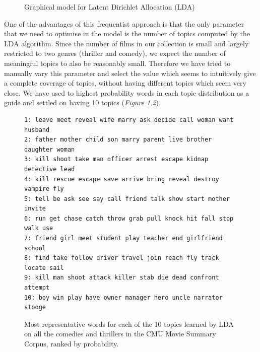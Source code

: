 \documentclass[bsc,frontabs,singlespacing,parskip, twoside]{infthesis}
\begin{document}
\begin{figure}[h!]
\centering
{}
\caption{Graphical model for Latent Dirichlet Allocation (LDA)}
\label{fig:lda}
\end{figure}

One of the advantages of this frequentist approach is that the only parameter that we need to optimise in the model is the number of topics computed by the LDA algorithm. Since the number of films in our collection is small and largely restricted to two genres (thriller and comedy), we expect the number of meaningful topics to also be reasonably small. Therefore we have tried to manually vary this parameter and select the value which seems to intuitively give a complete coverage of topics, without having different topics which seem very close. We have used to highest probability words in each topic distribution as a guide and settled on having 10 topics (\textit{Figure 1.2}).

\begin{figure}[h]
\begin{minipage}{14.6cm}
\begin{Verbatim}[frame=single]
1: leave meet reveal wife marry ask decide call woman want husband
2: father mother child son marry parent live brother daughter woman
3: kill shoot take man officer arrest escape kidnap detective lead
4: kill rescue escape save arrive bring reveal destroy vampire fly
5: tell be ask see say call friend talk show start mother invite
6: run get chase catch throw grab pull knock hit fall stop walk use
7: friend girl meet student play teacher end girlfriend school 
8: find take follow driver travel join reach fly track locate sail
9: kill man shoot attack killer stab die dead confront attempt
10: boy win play have owner manager hero uncle narrator stooge
\end{Verbatim}
\end{minipage}
\caption{Most representative words for each of the 10 topics learned by LDA on all the comedies and thrillers in the CMU Movie Summary Corpus, ranked by probability.}
\label{topics}
\end{figure}
\end{document}
